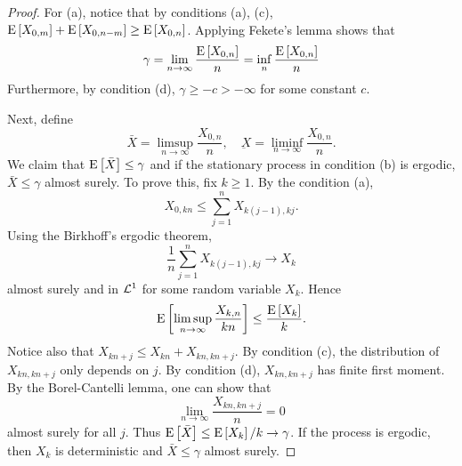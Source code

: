 \begin{proof}
    For (a), notice that by conditions (a), (c), 
    $\operatorname{E}\left[ {X_{0,m}} \right] + \operatorname{E}\left[ {X_{0,n-m}} \right]\geq \operatorname{E}\left[ {X_{0,n}} \right]$. 
    Applying Fekete's lemma shows that 
    \begin{equation*}
        \gamma = \lim_{n\to\infty}\frac{\operatorname{E}\left[ {X_{0,n}} \right]}{n} = \inf_{n}\frac{\operatorname{E}\left[ {X_{0,n}} \right]}{n}
    \end{equation*}
    Furthermore, by condition (d), $\gamma\geq -c>-\infty$ for some constant $c$. 

    Next, define 
    \begin{equation*}
        \bar{X} = \limsup_{n\to\infty}\frac{X_{0,n}}{n}, \quad 
        \underbar{X} = \liminf_{n\to\infty}\frac{X_{0,n}}{n}. 
    \end{equation*}
    We claim that $\operatorname{E}\left[ {\bar{X}} \right]\leq \gamma$ 
    and if the stationary process in condition (b) 
    is ergodic, $\bar{X}\leq \gamma$ almost surely. 
    To prove this, fix $k\geq 1$. By the condition (a), 
    \begin{equation*}
        X_{0,kn}\leq \sum_{j=1}^nX_{k(j-1),kj}. 
    \end{equation*} 
    Using the Birkhoff's ergodic theorem, 
    \begin{equation*}
        \frac{1}{n}\sum_{j=1}^nX_{k(j-1),kj} 
        \to X_k 
    \end{equation*}
    almost surely and in $\mathcal{L}^1$ for some 
    random variable $X_k$. Hence
    \begin{equation*}
        \operatorname{E}\left[ {\limsup_{n\to\infty}\frac{X_{k,n}}{kn}} \right]\leq \frac{\operatorname{E}\left[ {X_k} \right]}{k}. 
    \end{equation*}
    Notice also that $X_{kn+j}\leq X_{kn} + X_{kn,kn+j}$. 
    By condition (c), the distribution of $X_{kn,kn+j}$ only depends 
    on $j$. By condition (d), $X_{kn,kn+j}$ has finite 
    first moment. By the Borel-Cantelli lemma, one can show that 
    \begin{equation*}
        \lim_{n\to\infty}\frac{X_{kn,kn+j}}{n} = 0
    \end{equation*}
    almost surely for all $j$. Thus $\operatorname{E}\left[ {\bar{X}} \right]
    \leq \operatorname{E}\left[ {X_k} \right]/k\to\gamma$. If the process 
    is ergodic, then $X_k$ is deterministic and 
    $\bar{X}\leq \gamma$ almost surely. 


\end{proof}
